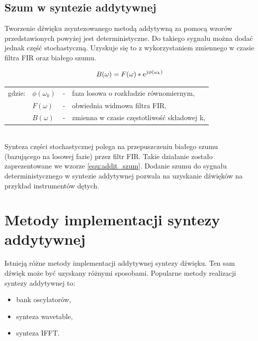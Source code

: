 \subsection{Szum w syntezie addytywnej}
Tworzenie dźwięku zsyntezowanego metodą addytywną za pomocą wzorów przedstawionych powyżej jest deterministyczne. Do takiego sygnału można dodać jednak część stochastyczną. Uzyskuje się to z wykorzystaniem zmiennego w czasie filtra FIR oraz białego szumu.

\begin{equation} \label{equ:addit_szum}
B(\omega) = F(\omega)*e^{j\phi(\omega_{k})} \\  
\end{equation}
\begin{tabular}{ l l l l}
	gdzie: & $\phi(\omega_{k})$ &  - & faza losowa o rozkładzie równomiernym, \\
	& $F(\omega)$ &  - & obwiednia widmowa filtra FIR, \\
	&	$B(\omega)$ & - & zmienna w czasie częstotliwość składowej k, \\
\end{tabular} \\

Synteza części stochastycznej polega na przepuszczeniu białego szumu (bazującego na losowej fazie) przez filtr FIR. Takie działanie zostało zaprezentowane we wzorze \ref{equ:addit_szum}.
Dodanie szumu do sygnału deterministycznego w syntezie addytywnej pozwala na uzyskanie dźwięków na przykład instrumentów dętych.

\section{Metody implementacji syntezy addytywnej}

Istnieją różne metody implementacji addytywnej syntezy dźwięku. Ten sam dźwięk może być uzyskany różnymi sposobami. Popularne metody realizacji syntezy addytywnej to:
\begin{itemize}
	\item bank oscylatorów,
	\item synteza wavetable,
	\item synteza IFFT.
\end{itemize}

